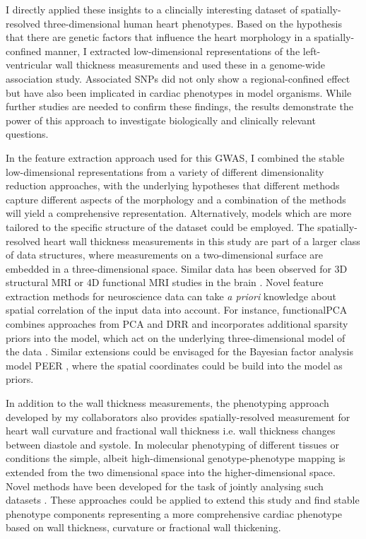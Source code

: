 I directly applied these insights to a clincially interesting dataset of spatially-resolved three-dimensional human heart phenotypes. Based on the hypothesis that there are genetic factors that influence the heart morphology in a spatially-confined manner, I extracted low-dimensional representations of the left-ventricular wall thickness measurements and used these in a genome-wide association study. Associated SNPs did not only show a regional-confined effect but have also been implicated in cardiac phenotypes in model organisms. While further studies are needed to confirm these findings, the results demonstrate the power of this approach to investigate biologically and clinically relevant questions.

In the feature extraction approach used for this GWAS, I combined the stable low-dimensional representations from a variety of different dimensionality reduction approaches, with the underlying hypotheses that different methods capture different aspects of the morphology and a combination of the methods will yield a comprehensive representation. Alternatively, models which are more tailored to the specific structure of the dataset could be employed. The spatially-resolved heart wall thickness measurements in this study are part of a larger class of data structures, where measurements on a two-dimensional surface are embedded in a three-dimensional space. Similar data has been observed for 3D structural MRI or 4D functional MRI studies in the brain \citep{vanEssen2012,Glasser2013}. Novel feature extraction methods for neuroscience data can take \textit{a priori} knowledge about spatial correlation of the input data into account. For instance, functionalPCA combines approaches from PCA and DRR and incorporates additional sparsity priors into the model, which act on the underlying three-dimensional model of the data \citep{Lila2016}. Similar extensions could be envisaged for the Bayesian factor analysis model PEER \citep{Stegle2012}, where the spatial coordinates could be build into the model as priors.

In addition to the wall thickness measurements, the phenotyping approach developed by my collaborators also provides spatially-resolved measurement for heart wall curvature and fractional wall thickness i.e. wall thickness changes between diastole and systole. In molecular phenotyping of different tissues or conditions the simple, albeit high-dimensional genotype-phenotype mapping is extended from the two dimensional  space into the higher-dimensional  space. Novel methods have been developed for the task of jointly analysing such datasets \citep{Hore2016}. These approaches could be applied to extend this study and find stable phenotype components representing a more comprehensive cardiac phenotype based on wall thickness, curvature or fractional wall thickening. 

